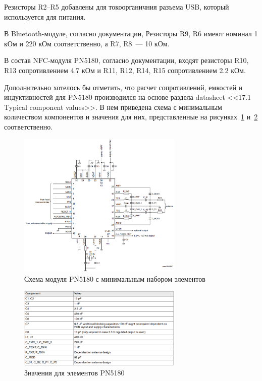 Резисторы R2--R5 добавлены для токоорганичния разъема USB, который используется для питания.

В Bluetooth-модуле, согласно документации, Резисторы R9, R6 имеют номинал 1 кОм и 220 кОм соответственно, а R7, R8~--- 10 кОм.

В состав NFC-модуля PN5180, согласно документации, входят резисторы R10, R13 сопротивлением 4.7 кОм и R11, R12, R14, R15 сопротивлением 2.2 кОм.

Дополнительно хотелось бы отметить, что расчет сопротивлений, емкостей и индуктивностей для PN5180 производился на основе раздела datasheet <<17.1 Typical component values>>\cite{pn5180_datasheet}.
В нем приведена схема с минимальным количеством компонентов и значения для них, представленные на рисунках~\ref{fig:pn5180mincomp} и~\ref{fig:pn5180mincompvalues} соответственно.


\begin{figure}[H]
    \centering
    \includegraphics[width=0.7\textwidth]{images/design/pn5180mincomp}
    \caption{\centering Схема модуля PN5180 с минимальным набором элементов}
    \label{fig:pn5180mincomp}
\end{figure}


\begin{figure}[H]
    \centering
    \includegraphics[width=0.7\textwidth]{images/design/pn5180mincompvalues}
    \caption{\centering Значения для элементов PN5180}
    \label{fig:pn5180mincompvalues}
\end{figure}

